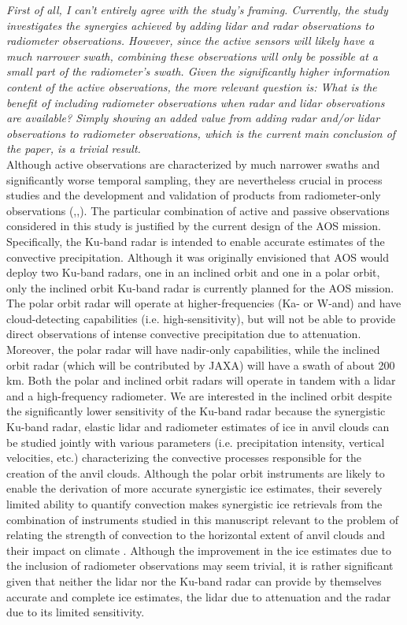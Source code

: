 \documentclass[12pt]{article}
\begin{document}
\noindent \textit{First of all, I can't entirely agree with the study's framing. Currently, 
the study investigates the synergies
achieved by adding lidar and radar observations to radiometer observations. 
However, since the active sensors will likely have a much narrower swath, 
combining these observations will only be possible at
a small part of the radiometer's swath. Given the significantly higher information 
content of the active observations, the more relevant question is: What is the 
benefit of including radiometer observations
when radar and lidar observations are available? Simply showing an added value 
from adding radar
and/or lidar observations to radiometer observations, which is the current main 
conclusion of the paper, is a trivial result.}\\
\newline
Although active observations are characterized by much narrower swaths and 
significantly worse temporal sampling, they are nevertheless crucial in process 
studies and the development and validation of products from radiometer-only
observations (\cite{stephens2008},\cite{sano2022},\cite{stubenrauch2021}).  The
particular combination of active and passive observations considered in this
study is justified by the current design of the AOS mission. Specifically,
the Ku-band radar is intended to enable accurate estimates of 
the convective precipitation.  Although it was originally envisioned that AOS would
deploy two Ku-band radars, one in an inclined orbit and one in a polar orbit, only
the inclined orbit Ku-band radar is currently planned for the AOS mission.  
The polar orbit radar will operate at higher-frequencies (Ka- or W-and) and 
have cloud-detecting capabilities (i.e. high-sensitivity), but
will not be able to provide direct observations of intense convective precipitation
due to attenuation. Moreover, the polar radar will have nadir-only capabilities,
while the inclined orbit radar (which will be contributed by JAXA) will have a
swath of about 200 km.  Both the polar and inclined orbit radars will operate
in tandem with a lidar and a high-frequency radiometer.  We are interested
in the inclined orbit despite the significantly lower sensitivity of the 
Ku-band radar because the synergistic Ku-band radar, elastic lidar and radiometer
estimates of ice in anvil clouds can be studied jointly with various parameters
(i.e. precipitation intensity, vertical velocities, etc.) characterizing the
convective processes responsible for the creation of the anvil clouds.  Although 
the polar orbit instruments are likely to enable the derivation of more accurate 
synergistic ice estimates, their severely limited ability to quantify convection
makes synergistic ice retrievals from the combination of instruments studied in
this manuscript relevant to the problem of relating the strength of convection to
the horizontal extent of anvil clouds and their impact on climate \cite{hartmann2016}.
Although the improvement in the ice estimates due to the inclusion of radiometer 
observations may seem trivial, it is rather significant given that neither the
lidar nor the Ku-band radar can provide by themselves accurate and complete 
ice estimates, the lidar
due to attenuation and the radar due to its limited sensitivity. \\
\end{document}
